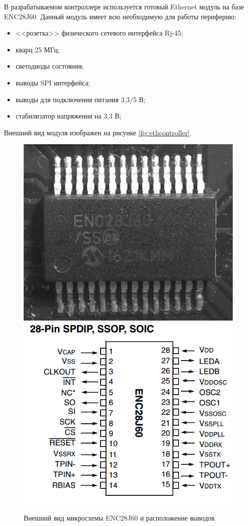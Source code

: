 В разрабатываемом контроллере используется готовый Ethernet модуль на базе ENC28J60. Данный модуль имеет всю необходимую для работы периферию:
\begin{itemize}
	\item <<розетка>> физического сетевого интерфейса Rj-45;
	\item кварц 25 МГц;
	\item светодиоды состояния;
	\item выводы SPI интерфейса;
	\item выводы для подключения питания 3,3/5 В;
	\item стабилизатор напряжения на 3,3 В;
\end{itemize}

Внешний вид модуля изображен на рисунке \ref{fig:ethcontroller}.

\begin{figure}[h!]
	\centering
		\includegraphics[scale=0.09]{img/enc28j60.png}
		\includegraphics[scale=0.36]{img/enc28j60io.png}
	\caption{Внешний вид микросхемы ENC28J60 и расположение выводов\label{fig:enc28j60}}
\end{figure}


